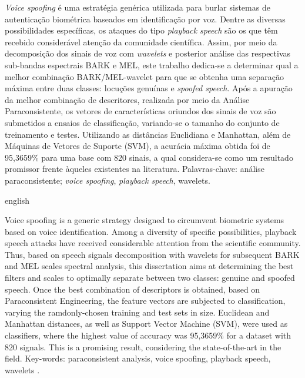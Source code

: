 \begin{resumo}
	\par \textit{Voice spoofing} é uma estratégia genérica utilizada para burlar sistemas de autenticação biométrica baseados em identificação por voz. Dentre as diversas possibilidades específicas, os ataques do tipo \textit{playback speech} são os que têm recebido considerável atenção da comunidade científica. Assim, por meio da decomposição dos sinais de voz com \textit{wavelets} e posterior análise das respectivas sub-bandas espectrais BARK e MEL, este trabalho dedica-se a determinar qual a melhor combinação BARK/MEL-wavelet para que se obtenha uma separação máxima entre duas classes: locuções genuínas e \textit{spoofed speech}. Após a apuração da melhor combinação de descritores, realizada por meio da Análise Paraconsistente, os vetores de características oriundos dos sinais de voz são submetidos a ensaios de classificação, variando-se o tamanho do conjunto de treinamento e testes. Utilizando as distâncias Euclidiana e Manhattan, além de Máquinas de Vetores de Suporte (SVM), a acurácia máxima obtida foi de 95,3659\% para uma base com 820 sinais, a qual considera-se como um resultado promissor frente àqueles existentes na literatura.\newline\newline
	Palavras-chave: análise paraconsistente; \textit{voice spoofing}, \textit{playback speech}, wavelets.
\end{resumo}

\begin{resumo}[Abstract]
	\begin{otherlanguage*}{english}
		\par Voice spoofing is a generic strategy designed to circumvent biometric systems based on voice identification. Among a diversity of specific possibilities, playback speech attacks have received considerable attention from the scientific community. Thus, based on speech signals decomposition with wavelets for subsequent BARK and MEL scales spectral analysis, this dissertation aims at determining the best filters and scales to optimally separate between two classes: genuine and spoofed speech. Once the best combination of descriptors is obtained, based on Paraconsistent Engineering, the feature vectors are subjected to classification, varying the ramdonly-chosen training and test sets in size. Euclidean and Manhattan distances, as well as Support Vector Machine (SVM), were used as classifiers, where the highest value of accuracy was 95,3659\% for a dataset with 820 signals. This is a promising result, considering the state-of-the-art in the field. \newline\newline
		Key-words: paraconsistent analysis, voice spoofing, playback speech, wavelets .
	\end{otherlanguage*}
\end{resumo}
